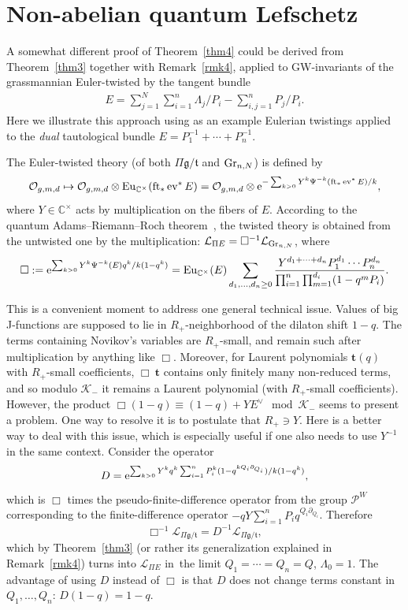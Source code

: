 \documentclass[pdftex]{sigma}
\numberwithin{equation}{section}
\def\K{\mathcal K}
\def\L{\mathcal L}
\def\O{\mathcal O}
\def\CC{\mathbb C}
\def\p{\partial}
\def\t{{\mathbf t}}
\def\ev{\operatorname{ev}}
\def\ft{\operatorname{ft}}
\def\Eu{\operatorname{Eu}}
\def\square{\Box}
\begin{document}
\section{Non-abelian quantum Lefschetz}\label{Sec6}

A somewhat different proof of Theorem~\ref{thm4} could be derived from Theorem~\ref{thm3} together with Remark~\ref{rmk4}, applied to GW-invariants of the grassmannian Euler-twisted by the tangent bundle
\begin{gather*}
E=\sum_{j=1}^N\sum_{i=1}^n\Lambda_j/P_i-\sum_{i,j=1}^nP_j/P_i.
\end{gather*}
Here we illustrate this approach using as an example Eulerian twistings applied to the {\em dual} tautological bundle $E=P_1^{-1}+\cdots+P_n^{-1}$.

The Euler-twisted theory (of both $\Pi \mathfrak{g}/\mathfrak{t}$ and ${\rm Gr}_{n,N}$) is defined by
\[
\O_{g,m,d}\mapsto \O_{g,m,d}\otimes \Eu_{\CC^{\times}}(\ft_*\ev^*E) = \O_{g,m,d}\otimes {\rm e}^{-\sum_{k>0} Y^k \Psi^{-k}(\ft_*\ev^* E)/k},
\]
where $Y\in \CC^{\times}$ acts by multiplication on the fibers of $E$. According to the quantum Adams--Riemann--Roch theorem~\cite{Givental:perm11}, the twisted theory is obtained from the untwisted one by the multiplication: $\L_{\Pi E}=\square^{-1} \L_{{\rm Gr}_{n,N}}$, where
\[
\square:= {\rm e}^{ \sum_{k>0} Y^k\Psi^{-k}(E) q^k/k(1-q^k)}
= \Eu_{\CC^{\times}}(E) \sum_{d_1,\dots,d_n\geq 0}\frac{Y^{d_1+\cdots+d_n}P_1^{d_1}\cdots P_n^{d_n}}{\prod_{i=1}^n\prod_{m=1}^{d_i}(1-q^mP_i)}.
\]

This is a convenient moment to address one general technical issue. Values of big J-functions are supposed to lie in $R_{+}$-neighborhood of the dilaton shift $1-q$. The terms containing Novikov's variables are $R_{+}$-small, and remain such after multiplication by anything like $\square$. Moreover, for Laurent polynomials $\t(q)$ with $R_{+}$-small coefficients, $\square\ \t$ contains only finitely many non-reduced terms, and so modulo $\K_{-}$ it remains a Laurent polynomial (with $R_{+}$-small coefficients). However, the product $\square (1-q) \equiv (1-q) + Y E^{\vee} \mod \K_{-}$ seems to present a problem. One way to resolve it is to postulate that $R_{+}\ni Y$. Here is a better way to deal with this issue, which is especially useful if one also needs to use $Y^{-1}$ in the same context. Consider the operator
\[
D={\rm e}^{ \sum_{k>0} Y^k q^k \sum_{i=1}^n P_i^k(1-q^{k Q_i\p_{Q_i}})/k(1-q^k)},
\]
which is $\square$ times the pseudo-finite-difference operator from the group ${\mathcal P}^W$ corresponding to the finite-difference operator $-qY\sum_{i=1}^n P_i q^{Q_i\p_{Q_i}}$. Therefore
\[
\square^{-1} \L_{\Pi \mathfrak{g}/\mathfrak{t}} = D^{-1}\L_{\Pi \mathfrak{g}/\mathfrak{t}},
\]
which by Theorem~\ref{thm3} (or rather its generalization explained in Remark~\ref{rmk4}) turns into $\L_{\Pi E}$ in~the limit $Q_1=\cdots=Q_n=Q$, $\Lambda_0=1$. The advantage of using $D$ instead of $\square$ is that $D$ does not change terms constant in $Q_1,\dots,Q_n$: $D(1-q)=1-q$.
\end{document}
